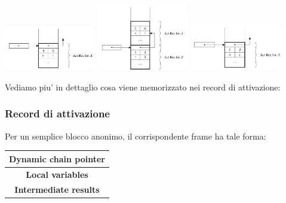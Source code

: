 \begin{center}
  \includegraphics[width=0.3\textwidth]{img/2025-03-02-11-40-29.png}
  \includegraphics[width=0.3\textwidth]{img/2025-03-02-11-41-09.png}
  \includegraphics[width=0.3\textwidth]{img/2025-03-02-11-42-23.png}
\end{center}

Vediamo piu' in dettaglio cosa viene memorizzato nei record di attivazione:

\subsubsection{Record di attivazione}
Per un semplice blocco anonimo, il corrispondente frame ha tale forma:
\begin{center}
    \renewcommand{\arraystretch}{2} %
    \setlength{\tabcolsep}{2em} %
    
    \begin{tabular}{|c|}
        \hline
        \textbf{Dynamic chain pointer} \\ \hline
        \textbf{Local variables} \\ \hline
        \textbf{Intermediate results} \\ \hline
    \end{tabular}
\end{center}


